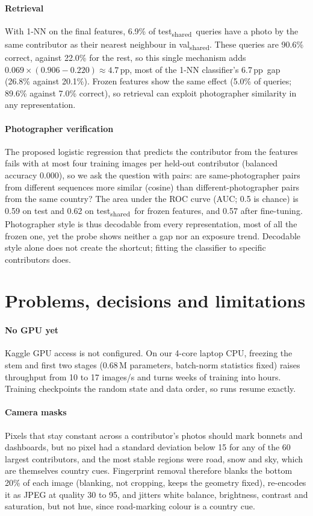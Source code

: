 \documentclass[9pt]{extarticle}
\newcommand{\tsh}{test\textsubscript{shared}}
\newcommand{\vsh}{val\textsubscript{shared}}
\newcommand{\pp}{\,pp}
\begin{document}
\paragraph{Retrieval} With 1-NN on the final features, 6.9\% of \tsh\ queries have a photo by
the same contributor as their nearest neighbour in \vsh. These queries are 90.6\% correct,
against 22.0\% for the rest, so this single mechanism adds
$0.069\times(0.906-0.220)\approx4.7$\pp, most of the 1-NN classifier's 6.7\pp\ gap (26.8\%
against 20.1\%). Frozen features show the same effect (5.0\% of queries; 89.6\% against
7.0\% correct), so retrieval can exploit photographer similarity in any representation.

\paragraph{Photographer verification} The proposed logistic regression that predicts the
contributor from the features fails with at most four training images per held-out
contributor (balanced accuracy 0.000), so we ask the question with pairs: are
same-photographer pairs from different sequences more similar (cosine) than
different-photographer pairs from the same country? The area under the ROC curve (AUC; 0.5
is chance) is 0.59 on test and 0.62 on \tsh\ for frozen features, and 0.57 after
fine-tuning. Photographer style is thus decodable from every representation, most of all the
frozen one, yet the probe shows neither a gap nor an exposure trend. Decodable style alone
does not create the shortcut; fitting the classifier to specific contributors does.

\section{Problems, decisions and limitations}
\label{sec:problems}
\paragraph{No GPU yet} Kaggle GPU access is not configured. On our 4-core laptop CPU, freezing the stem and first two stages (0.68\,M
parameters, batch-norm statistics fixed) raises throughput from 10 to 17 images/s and turns
weeks of training into hours. Training checkpoints the random state and data order, so runs
resume exactly.

\paragraph{Camera masks} Pixels that stay constant across a contributor's photos should mark
bonnets and dashboards, but no pixel had a standard deviation below 15 for any of the 60
largest contributors, and the most stable regions were road, snow and sky, which are
themselves country cues. Fingerprint removal therefore blanks the bottom 20\% of each image
(blanking, not cropping, keeps the geometry fixed), re-encodes it as JPEG at quality 30
to 95, and jitters white balance, brightness, contrast and saturation, but not hue, since
road-marking colour is a country cue.
\end{document}
